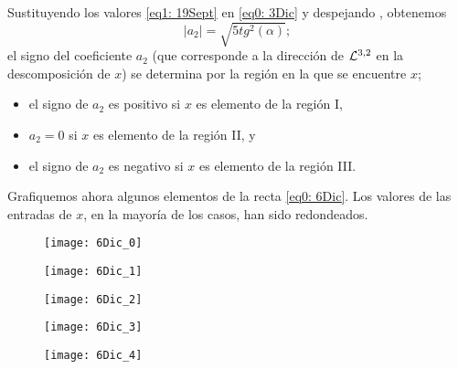 \begin{ejemplo}
\noindent
Sustituyendo
los valores \eqref{eq1: 19Sept} en \eqref{eq0: 3Dic} y
despejando
, obtenemos 
\[
|a_{2}|= \sqrt{5 tg^{2}(\alpha)};
\]
el signo del coeficiente $a_{2}$ (que corresponde a la dirección
de $\mathcal{L}^{3,2}$ en la descomposición de $x$) se determina por
la región en la que se encuentre $x$;

\begin{itemize}
\item el signo de $a_{2}$ es positivo si $x$ es elemento de la región I,
\item $a_{2}=0$ si $x$ es elemento de la región II, y
\item el signo de $a_{2}$ es negativo si $x$ es elemento de la región III.
\end{itemize}


Grafiquemos ahora algunos elementos
de la recta \eqref{eq0: 6Dic}.
Los valores de las entradas de $x$, en la
mayoría de los casos, han sido redondeados.


\begin{figure}[H]
	\centering
	\texttt{[image: 6Dic\_0]}
\end{figure}



\begin{figure}[H]
	\centering
	\texttt{[image: 6Dic\_1]}
\end{figure}

\begin{figure}[H]
	\centering
	\texttt{[image: 6Dic\_2]}
\end{figure}

\begin{figure}[H]
	\centering
	\texttt{[image: 6Dic\_3]}
\end{figure}

\begin{figure}[H]
	\centering
	\texttt{[image: 6Dic\_4]}
\end{figure}


\final
\end{ejemplo}





